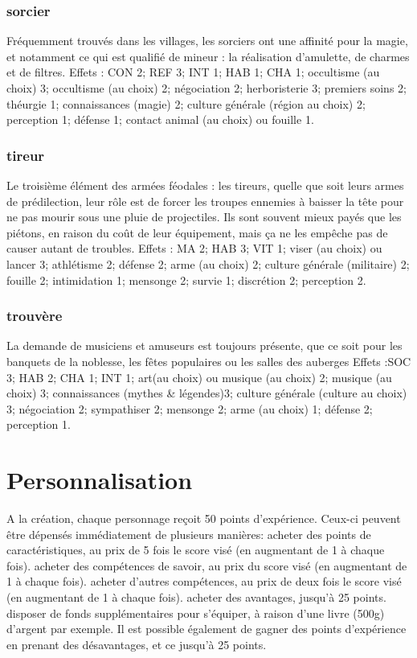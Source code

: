 \documentclass[10pt,a4paper,twocolumn]{book}
\begin{document}
\subsubsection{sorcier}
Fréquemment trouvés dans les villages, les sorciers ont une affinité pour la magie, et notamment ce qui est qualifié de mineur : la réalisation d’amulette, de charmes et de filtres.
Effets : CON 2; REF 3; INT 1; HAB 1; CHA 1; occultisme (au choix) 3; occultisme (au choix) 2; négociation 2; herboristerie 3; premiers soins 2; théurgie 1; connaissances (magie) 2; culture générale (région au choix) 2; perception 1; défense 1; contact animal (au choix) ou fouille 1.
\subsubsection{tireur}
Le troisième élément des armées féodales : les tireurs, quelle que soit leurs armes de prédilection, leur rôle est de forcer les troupes ennemies à baisser la tête pour ne pas mourir sous une pluie de projectiles. Ils sont souvent mieux payés que les piétons, en raison du coût de leur équipement, mais ça ne les empêche pas de causer autant de troubles.
Effets : MA 2; HAB 3; VIT 1; viser (au choix) ou lancer 3; athlétisme 2; défense 2; arme (au choix) 2; culture générale (militaire) 2; fouille 2; intimidation 1; mensonge 2; survie 1; discrétion 2; perception 2.
\subsubsection{trouvère}
La demande de musiciens et amuseurs est toujours présente, que ce soit pour les banquets de la noblesse, les fêtes populaires ou les salles des auberges
Effets :SOC 3; HAB 2; CHA 1; INT 1; art(au choix) ou musique (au choix) 2; musique (au choix) 3; connaissances (mythes \& légendes)3; culture générale (culture au choix) 3; négociation 2; sympathiser 2; mensonge 2; arme (au choix) 1; défense 2; perception 1.

\section{Personnalisation}
A la création, chaque personnage reçoit 50 points d’expérience. Ceux-ci peuvent être dépensés immédiatement de plusieurs manières:
acheter des points de caractéristiques, au prix de 5 fois le score visé (en augmentant de 1 à chaque fois).
acheter des compétences de savoir, au prix du score visé (en augmentant de 1 à chaque fois).
acheter d’autres compétences, au prix de deux fois le score visé (en augmentant de 1 à chaque fois).
acheter des avantages, jusqu’à 25 points.
disposer de fonds supplémentaires pour s’équiper, à raison d’une livre (500g) d’argent par exemple.
Il est possible également de gagner des points d’expérience en prenant des désavantages, et ce jusqu’à 25 points.
\end{document}
